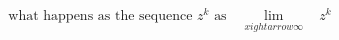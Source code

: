 \documentclass[preview]{standalone}
\begin{document}
\begin{align*}
\text{what happens as the sequence } z^k \text{ as } \text{ $\lim_{x 
ightarrow \infty}$ } \ z^k
\end{align*}
\end{document}
